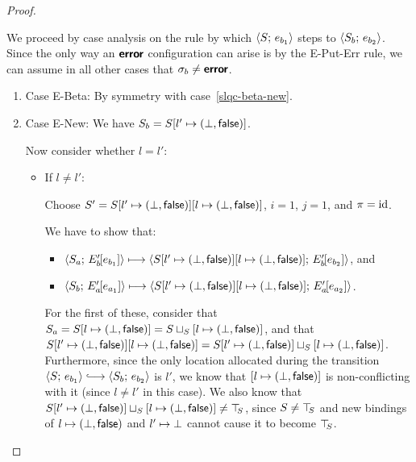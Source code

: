 \begin{proof}
\begin{enumerate}
    We proceed by case analysis on the rule by which
    $\langle S;\, e_{b_1} \rangle$ steps to $\langle S_b;\, e_{b_2} \rangle$.  Since the
    only way an $\textbf{\textsf{error}}$ configuration can arise is by the {\sc
      E-Put-Err} rule, we can assume in all other cases that $\sigma_b
    \neq \textbf{\textsf{error}}$.
    \begin{enumerate}
    \item \label{slqc-new-beta}Case {\sc E-Beta}: By symmetry with case~\ref{slqc-beta-new}.
    \item \label{slqc-new-new}Case {\sc E-New}: We have $S_b = S[l' \mapsto (\bot, \textsf{false})]$.

      Now consider whether $l = l'$:
      \begin{itemize}
        \item If $l \neq l'$:

          Choose $S' = S[l' \mapsto (\bot, \textsf{false})][l \mapsto (\bot, \textsf{false})]$, $i =
          1$, $j = 1$, and $\pi = \mathrm{id}$.

          We have to show that:
          \begin{itemize}
          \item
            $\langle S_a;\, E'_b\hspace{-1mm}\left[e_{b_1}\right] \rangle
            \longmapsto
            \langle S[l' \mapsto (\bot, \textsf{false})][l \mapsto (\bot, \textsf{false})];\, E'_b\hspace{-1mm}\left[e_{b_2}\right] \rangle$,
            and
          \item
            $\langle S_b;\, E'_a\hspace{-1mm}\left[e_{a_1}\right] \rangle
            \longmapsto
            \langle S[l' \mapsto (\bot, \textsf{false})][l \mapsto (\bot, \textsf{false})];\, E'_a\hspace{-1mm}\left[e_{a_2}\right] \rangle$.
          \end{itemize}

          For the first of these, consider that $S_a =
          S[l \mapsto (\bot, \textsf{false})] =
          S \sqcup_{S} \left[ l \mapsto (\bot, \textsf{false}) \right]$, and that
          $S[l' \mapsto (\bot, \textsf{false})][l \mapsto (\bot, \textsf{false})] =
          S[l' \mapsto (\bot, \textsf{false})] \sqcup_{S} \left[ l \mapsto (\bot, \textsf{false}) \right]$.
          Furthermore, since the only location allocated during the
          transition $\config{S}{e_{b_1}} \parstepsto
          \config{S_b}{e_{b_2}}$ is $l'$, we know that
          $\left[ l \mapsto (\bot, \textsf{false}) \right]$ is non-conflicting with
          it (since $l \neq l'$ in this case).  We also know that
          $S[l' \mapsto (\bot, \textsf{false})] \sqcup_{S} \left[ l \mapsto (\bot, \textsf{false}) \right]
          \neq \top\hspace{-0.85mm}_{S}$, since $S \neq \top\hspace{-0.85mm}_{S}$ and new bindings of
          $l \mapsto (\bot, \textsf{false})$ and $l' \mapsto \bot$
          cannot cause it to become $\top\hspace{-0.85mm}_{S}$.


\end{itemize}
\end{enumerate}
\end{enumerate}
\end{proof}
